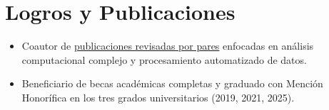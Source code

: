 \documentclass[10pt,a4paper]{article}
\begin{document}
\section*{Logros y Publicaciones}
\begin{itemize}[leftmargin=1.5em]
    \item Coautor de \href{https://ui.adsabs.harvard.edu/search/fq...}{publicaciones revisadas por pares} enfocadas en análisis computacional complejo y procesamiento automatizado de datos.
    \item Beneficiario de becas académicas completas y graduado con Mención Honorífica en los tres grados universitarios (2019, 2021, 2025).
\end{itemize}
\end{document}
